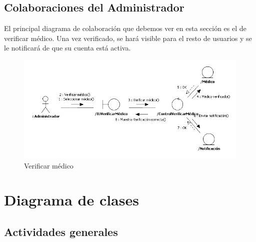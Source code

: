 \documentclass[a4paper,oneside,11pt]{book}
\begin{document}
	
		\newpage
		\subsection{Colaboraciones del Administrador} %
		\label{sub:colaboraciones_del_administrador}
		
			El principal diagrama de colaboración que debemos ver en esta sección es el de verificar médico. Una vez verificado, se hará visible para el resto de usuarios y se le notificará de que su cuenta está activa.
			
			\begin{figure}[H]
			  \centering
			    \includegraphics[width=16cm]{img/jpg/colaboraciones/42_VerificarMedico.jpg}
			  \caption{Verificar médico}
			  \label{fig:col_verificar_admin}
			\end{figure}
		
		

	\newpage
	\section{Diagrama de clases} %
	\label{sec:diagrama_de_clases}
	
	\subsection{Actividades generales} %
	\label{sub:actividades_generales}
		
\end{document}
